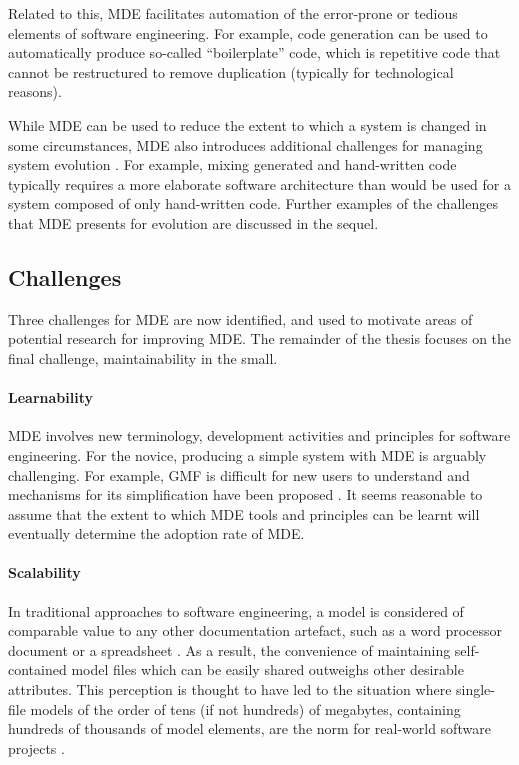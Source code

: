 Related to this, MDE facilitates automation of the error-prone or tedious elements of software engineering. For example, code generation can be used to automatically produce so-called ``boilerplate'' code, which is repetitive code that cannot be restructured to remove duplication (typically for technological reasons).

While MDE can be used to reduce the extent to which a system is changed in some circumstances, MDE also introduces additional challenges for managing system evolution \cite{Mens07}. For example, mixing generated and hand-written code typically requires a more elaborate software architecture than would be used for a system composed of only hand-written code. Further examples of the challenges that MDE presents for evolution are discussed in the sequel.

\subsection{Challenges}
\label{subsec:mde_challenges}
Three challenges for MDE are now identified, and used to motivate areas of potential research for improving MDE. The remainder of the thesis focuses on the final challenge, maintainability in the small.

\paragraph{Learnability} MDE involves new terminology, development activities and principles for software engineering. For the novice, producing a simple system with MDE is arguably challenging. For \cc example, GMF is difficult for new users to understand and mechanisms for its simplification have been proposed \cite{kolovos10eugenia}. It seems reasonable to assume that the extent to which MDE tools and principles can be learnt will eventually determine the adoption rate of MDE.

\paragraph{Scalability} In \cc traditional approaches to software engineering, a model is considered of comparable value to any other documentation artefact, such as a word processor document or a spreadsheet \cite{rose10concordance}. As a result, the convenience of maintaining self-contained model files which can be easily shared outweighs other desirable attributes. This \cc perception is thought to have led to the situation where single-file models of the order of tens (if not hundreds) of megabytes, containing hundreds of thousands of model elements, are the norm for real-world software projects \cite{kolovos08scalability}.

